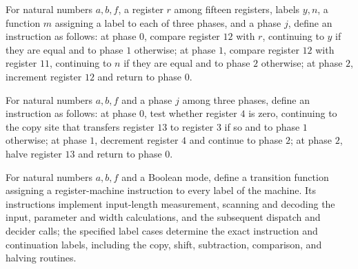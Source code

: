 \begin{definition}
\label{Complexity.PathHard.leI}
\leanok
{}
For natural numbers $a,b,f$, a register $r$ among fifteen registers, labels $y,n$, a
function $m$ assigning a label to each of three phases, and a phase $j$, define an
instruction as follows: at phase $0$, compare register $12$ with $r$, continuing to $y$
if they are equal and to phase $1$ otherwise; at phase $1$, compare register $12$ with
register $11$, continuing to $n$ if they are equal and to phase $2$ otherwise; at phase
$2$, increment register $12$ and return to phase $0$.
\end{definition}

\begin{definition}
\label{Complexity.PathHard.hvI}
\leanok
{}
For natural numbers $a,b,f$ and a phase $j$ among three phases, define an instruction as
follows: at phase $0$, test whether register $4$ is zero, continuing to the copy site
that transfers register $13$ to register $3$ if so and to phase $1$ otherwise; at phase
$1$, decrement register $4$ and continue to phase $2$; at phase $2$, halve register $13$
and return to phase $0$.
\end{definition}

\begin{definition}
\label{Complexity.PathHard.A}
\leanok
{}
For natural numbers $a,b,f$ and a Boolean mode, define a transition function assigning a
register-machine instruction to every label of the machine. Its instructions implement
input-length measurement, scanning and decoding the input, parameter and width
calculations, and the subsequent dispatch and decider calls; the specified label cases
determine the exact instruction and continuation labels, including the copy, shift,
subtraction, comparison, and halving routines.
\end{definition}

